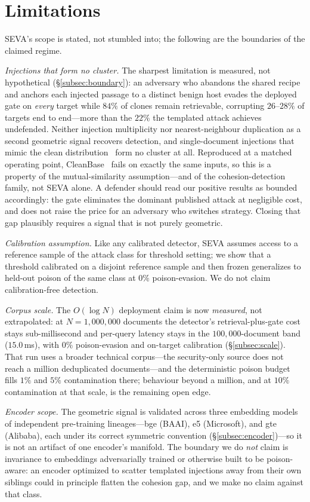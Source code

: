 \documentclass[10pt,journal,compsoc]{IEEEtran}
\begin{document}
\section{Limitations}
\label{sec:limits}
SEVA's scope is stated, not stumbled into; the following are the boundaries of the
claimed regime.

\emph{Injections that form no cluster.} The sharpest limitation is measured, not hypothetical
(\S\ref{subsec:boundary}): an adversary who abandons the shared recipe and anchors each injected
passage to a distinct benign host evades the deployed gate on \emph{every} target while $84\%$
of clones remain retrievable, corrupting $26$--$28\%$ of targets end to end---more than the
$22\%$ the templated attack achieves undefended. Neither injection multiplicity nor
nearest-neighbour duplication as a second geometric signal recovers detection, and
single-document injections that mimic the clean distribution~\cite{corruptrag} form no cluster
at all. Reproduced at a matched operating point, CleanBase~\cite{cleanbase} fails on exactly the
same inputs, so this is a property of the mutual-similarity assumption---and of the
cohesion-detection family, not SEVA alone. A defender should read our positive results as
bounded accordingly: the gate eliminates the dominant published attack at negligible cost, and
does not raise the price for an adversary who switches strategy. Closing that gap plausibly
requires a signal that is not purely geometric.

\emph{Calibration assumption.} Like any calibrated detector, SEVA assumes access
to a reference sample of the attack class for threshold setting; we show that a
threshold calibrated on a disjoint reference sample and then frozen generalizes to
held-out poison of the same class at $0\%$ poison-evasion.
We do not claim calibration-free detection.

\emph{Corpus scale.} The $O(\log N)$ deployment claim is now \emph{measured}, not
extrapolated: at $N=1{,}000{,}000$ documents the detector's retrieval-plus-gate cost
stays sub-millisecond and per-query latency stays in the $100{,}000$-document band
($15.0$\,ms), with $0\%$ poison-evasion and on-target calibration
(\S\ref{subsec:scale}). That run uses a broader technical corpus---the security-only
source does not reach a million deduplicated documents---and the deterministic poison
budget fills $1\%$ and $5\%$ contamination there; behaviour beyond a million, and at
$10\%$ contamination at that scale, is the remaining open edge.

\emph{Encoder scope.} The geometric signal is validated across three embedding models
of independent pre-training lineages---bge (BAAI), e5 (Microsoft), and gte (Alibaba),
each under its correct symmetric convention (\S\ref{subsec:encoder})---so it is not an
artifact of one encoder's manifold. The boundary we do \emph{not} claim is invariance
to embeddings adversarially trained or otherwise built to be poison-aware: an encoder
optimized to scatter templated injections away from their own siblings could in
principle flatten the cohesion gap, and we make no claim against that class.
\end{document}
